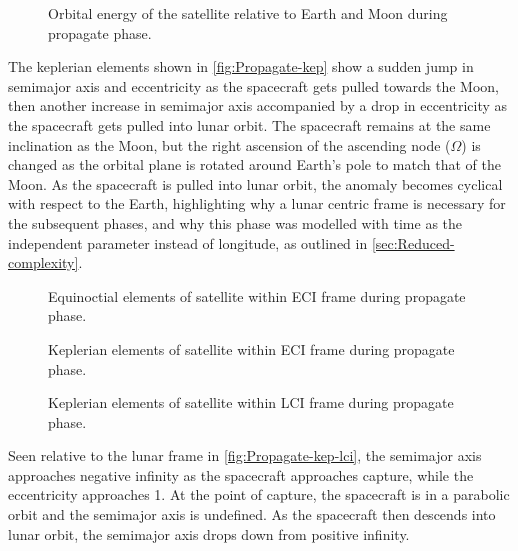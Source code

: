 \begin{figure}
\caption{Orbital energy of the satellite relative to Earth and Moon during propagate phase.}
\label{fig:Propagate-orbeng}
\centering
\def\svgwidth{\figurewidth}

\end{figure}

The keplerian elements shown in \autoref{fig:Propagate-kep} show a sudden jump in semimajor axis and eccentricity as the spacecraft gets pulled towards the Moon, then another increase in semimajor axis accompanied by a drop in eccentricity as the spacecraft gets pulled into lunar orbit. The spacecraft remains at the same inclination as the Moon, but the right ascension of the ascending node ($\Omega$) is changed as the orbital plane is rotated around Earth's pole to match that of the Moon. As the spacecraft is pulled into lunar orbit, the anomaly becomes cyclical with respect to the Earth, highlighting why a lunar centric frame is necessary for the subsequent phases, and why this phase was modelled with time as the independent parameter instead of longitude, as outlined in \autoref{sec:Reduced-complexity}.

\begin{figure}
\caption{Equinoctial elements of satellite within ECI frame during propagate phase.}
\label{fig:Propagate-mee}
\centering
\def\svgwidth{\figurewidth}

\end{figure}

\begin{figure}
\caption{Keplerian elements of satellite within ECI frame during propagate phase.}
\label{fig:Propagate-kep}
\centering
\def\svgwidth{\figurewidth}

\end{figure}

\begin{figure}
\caption{Keplerian elements of satellite within LCI frame during propagate phase.}
\label{fig:Propagate-kep-lci}
\centering
\def\svgwidth{\figurewidth}

\end{figure}

Seen relative to the lunar frame in \autoref{fig:Propagate-kep-lci}, the semimajor axis approaches negative infinity as the spacecraft approaches capture, while the eccentricity approaches 1. At the point of capture, the spacecraft is in a parabolic orbit and the semimajor axis is undefined. As the spacecraft then descends into lunar orbit, the semimajor axis drops down from positive infinity.

